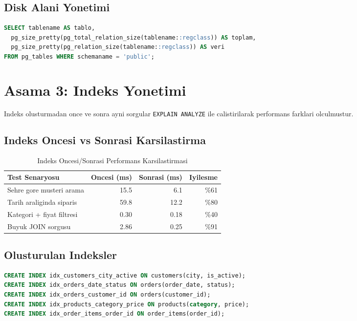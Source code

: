 \documentclass[12pt,a4paper]{article}
\begin{document}
\subsection{Disk Alani Yonetimi}
\begin{lstlisting}[language=SQL, caption=Tablo ve Indeks Boyutlari]
SELECT tablename AS tablo,
  pg_size_pretty(pg_total_relation_size(tablename::regclass)) AS toplam,
  pg_size_pretty(pg_relation_size(tablename::regclass)) AS veri
FROM pg_tables WHERE schemaname = 'public';
\end{lstlisting}

\section{Asama 3: Indeks Yonetimi}
Indeks olusturmadan once ve sonra ayni sorgular \texttt{EXPLAIN ANALYZE} ile calistirilarak performans farklari olculmustur.

\subsection{Indeks Oncesi vs Sonrasi Karsilastirma}

\begin{table}[h]
\centering
\begin{tabular}{|l|r|r|r|}
\hline
\textbf{Test Senaryosu} & \textbf{Oncesi (ms)} & \textbf{Sonrasi (ms)} & \textbf{Iyilesme} \\
\hline
Sehre gore musteri arama & 15.5 & 6.1 & \%61 \\
Tarih araliginda siparis & 59.8 & 12.2 & \%80 \\
Kategori + fiyat filtresi & 0.30 & 0.18 & \%40 \\
Buyuk JOIN sorgusu & 2.86 & 0.25 & \%91 \\
\hline
\end{tabular}
\caption{Indeks Oncesi/Sonrasi Performans Karsilastirmasi}
\end{table}

\subsection{Olusturulan Indeksler}
\begin{lstlisting}[language=SQL, caption=Bilesik Indeks Ornekleri]
CREATE INDEX idx_customers_city_active ON customers(city, is_active);
CREATE INDEX idx_orders_date_status ON orders(order_date, status);
CREATE INDEX idx_orders_customer_id ON orders(customer_id);
CREATE INDEX idx_products_category_price ON products(category, price);
CREATE INDEX idx_order_items_order_id ON order_items(order_id);
\end{lstlisting}
\end{document}

